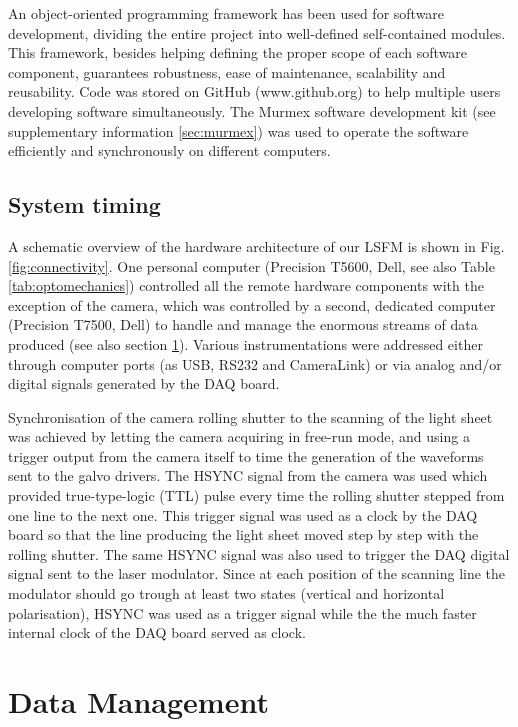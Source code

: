 \documentclass[12pt]{spieman}  %
\begin{document}
\begin{spacing}{2}
An object-oriented programming framework \cite{castagna1997object} has been used for software development, dividing the entire project into well-defined self-contained modules. This framework, besides helping defining the proper scope of each software component, guarantees robustness, ease of maintenance, scalability and reusability. Code was stored on GitHub (www.github.org) to help multiple users developing software simultaneously. The Murmex software development kit (see supplementary information \ref{sec:murmex}) was used to operate the software efficiently and synchronously on different computers.



\subsection{System timing}
\label{sec:timing}

A schematic overview of the hardware architecture of our LSFM is shown in Fig. \ref{fig:connectivity}. One personal computer (Precision T5600, Dell, see also Table \ref{tab:optomechanics}) controlled all the remote hardware components with the exception of the camera, which was controlled by a second, dedicated computer (Precision T7500, Dell) to handle and manage the enormous streams of data produced (see also section \ref{sec:dataflow}). Various instrumentations were addressed either through computer ports (as USB, RS232 and CameraLink) or via analog and/or digital signals generated by the DAQ board.

Synchronisation of the camera rolling shutter to the scanning of the light sheet was achieved by letting the camera acquiring in free-run mode, and using a trigger output from the camera itself to time the generation of the waveforms sent to the galvo drivers. The HSYNC signal from the camera was used which provided true-type-logic (TTL) pulse every time the rolling shutter stepped from one line to the next one. This trigger signal was used as a clock by the DAQ board so that the line producing the light sheet moved step by step with the rolling shutter. The same HSYNC signal was also used to trigger the DAQ digital signal sent to the laser modulator. Since at each position of the scanning line the modulator should go trough at least two states (vertical and horizontal polarisation), HSYNC was used as a trigger signal while the the much faster internal clock of the DAQ board served as clock.



\section{Data Management}
\label{sec:dataflow}


\end{spacing}
\end{document}
